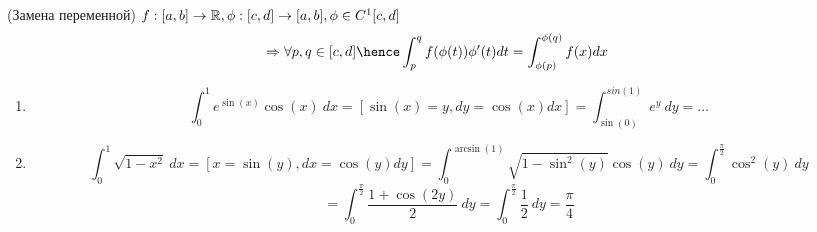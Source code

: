 \begin{properties}
    \item(Замена переменной) $ f:[a, b] \to \mathbb{R}, \phi : [c, d] \to [a, b], \phi \in C^1[c, d]$ 
    \[\Rightarrow
    \forall p, q \in [c, d] \hence \int_p^q f(\phi(t)) \phi'(t) dt
    = \int_{\phi(p)}^{\phi(q)} f(x) dx\]

    \begin{example}
        \begin{enumerate}
            \item \[ \int_0^1 e^{\sin(x)} \cos(x) \ dx = [\sin(x) = y, dy = \cos(x) dx] 
            = \int_{\sin(0)}^{sin(1)} e^y \ dy = \ldots \]
            \item \[ \int_0^1 \sqrt{1 - x^2} \ dx = [x = \sin(y), dx 
            = \cos(y) dy] = \int_0^{\arcsin(1)} \sqrt{1 - \sin^2(y)} \cos(y) \ dy 
            = \int_0^{\frac \pi 2} \cos^2(y) \ dy \] 
            \[ = \int_0^{\frac \pi 2} \frac {1 + \cos(2y)} 2 \ dy
            = \int_0^{\frac \pi 2} \frac 1 2 \ dy = \frac \pi 4\]
        \end{enumerate}
    \end{example}
\end{properties}
